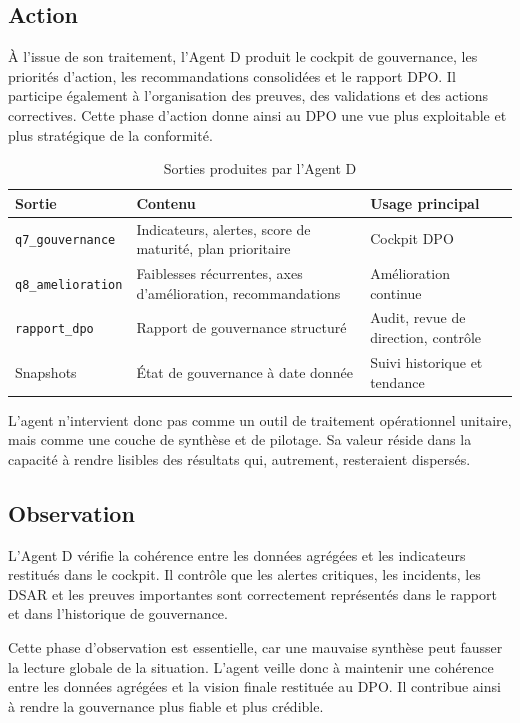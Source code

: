 \documentclass[12pt,a4paper]{report}
\begin{document}
\subsection{Action}

À l'issue de son traitement, l'Agent D produit le cockpit de gouvernance, les priorités d'action, les recommandations consolidées et le rapport DPO. Il participe également à l'organisation des preuves, des validations et des actions correctives. Cette phase d'action donne ainsi au DPO une vue plus exploitable et plus stratégique de la conformité.

\begin{table}[H]
\centering
\caption{Sorties produites par l'Agent D}
\label{tab:outputs_agent_d}
\begin{tabularx}{\textwidth}{|p{3cm}|X|p{3.2cm}|}
\hline
\textbf{Sortie} & \textbf{Contenu} & \textbf{Usage principal} \\
\hline
\texttt{q7\_gouvernance} & Indicateurs, alertes, score de maturité, plan prioritaire & Cockpit DPO \\
\hline
\texttt{q8\_amelioration} & Faiblesses récurrentes, axes d'amélioration, recommandations & Amélioration continue \\
\hline
\texttt{rapport\_dpo} & Rapport de gouvernance structuré & Audit, revue de direction, contrôle \\
\hline
Snapshots & État de gouvernance à date donnée & Suivi historique et tendance \\
\hline
\end{tabularx}
\end{table}

L'agent n'intervient donc pas comme un outil de traitement opérationnel unitaire, mais comme une couche de synthèse et de pilotage. Sa valeur réside dans la capacité à rendre lisibles des résultats qui, autrement, resteraient dispersés.

\subsection{Observation}

L'Agent D vérifie la cohérence entre les données agrégées et les indicateurs restitués dans le cockpit. Il contrôle que les alertes critiques, les incidents, les DSAR et les preuves importantes sont correctement représentés dans le rapport et dans l'historique de gouvernance.

Cette phase d'observation est essentielle, car une mauvaise synthèse peut fausser la lecture globale de la situation. L'agent veille donc à maintenir une cohérence entre les données agrégées et la vision finale restituée au DPO. Il contribue ainsi à rendre la gouvernance plus fiable et plus crédible.
\end{document}
